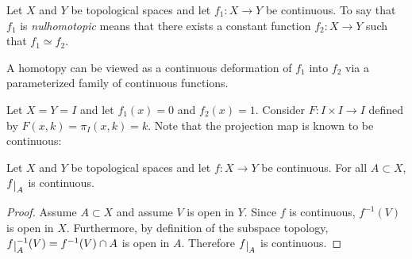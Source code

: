 \documentclass[letterpaper,12pt,fleqn]{article}
\begin{document}
\begin{definition}[Nulhomotopic]
  Let \(X\) and \(Y\) be topological spaces and let \(f_1:X\to Y\) be continuous.  To say that \(f_1\) is
  \emph{nulhomotopic} means that there exists a constant function \(f_2:X\to Y\) such that \(f_1\simeq f_2\).
\end{definition}

A homotopy can be viewed as a continuous deformation of \(f_1\) into \(f_2\) via a parameterized family of
continuous functions.

\begin{example}
  Let \(X=Y=I\) and let \(f_1(x)=0\) and \(f_2(x)=1\).  Consider \(F:I\times I\to I\) defined by
  \(F(x,k)=\pi_{I}(x,k)=k\).  Note that the projection map is known to be continuous:

\end{example}

\begin{lemma}
  Let \(X\) and \(Y\) be topological spaces and let \(f:X\to Y\) be continuous.  For all \(A\subset X\),
  \(\restrict{f}{A}\) is continuous.
\end{lemma}

\begin{proof}
  Assume \(A\subset X\) and assume \(V\) is open in \(Y\).  Since \(f\) is continuous, \(f^{-1}(V)\) is open in
  \(X\).  Furthermore, by definition of the subspace topology, \(\restrict{f}{A}^{-1}(V)=f^{-1}(V)\cap A\) is open
  in \(A\).  Therefore \(\restrict{f}{A}\) is continuous.
\end{proof}
\end{document}
